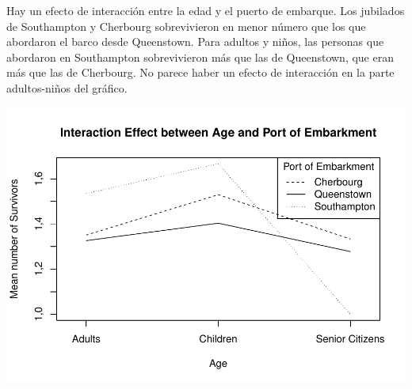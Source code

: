\documentclass[]{article}
\newenvironment{Shaded}{\begin{snugshade}}{\end{snugshade}}
\newcommand{\KeywordTok}[1]{\textcolor[rgb]{0.13,0.29,0.53}{\textbf{#1}}}
\newcommand{\DataTypeTok}[1]{\textcolor[rgb]{0.13,0.29,0.53}{#1}}
\newcommand{\DecValTok}[1]{\textcolor[rgb]{0.00,0.00,0.81}{#1}}
\newcommand{\StringTok}[1]{\textcolor[rgb]{0.31,0.60,0.02}{#1}}
\newcommand{\OtherTok}[1]{\textcolor[rgb]{0.56,0.35,0.01}{#1}}
\newcommand{\OperatorTok}[1]{\textcolor[rgb]{0.81,0.36,0.00}{\textbf{#1}}}
\newcommand{\NormalTok}[1]{#1}
\begin{document}
Hay un efecto de interacción entre la edad y el puerto de embarque. Los
jubilados de Southampton y Cherbourg sobrevivieron en menor número que
los que abordaron el barco desde Queenstown. Para adultos y niños, las
personas que abordaron en Southampton sobrevivieron más que las de
Queenstown, que eran más que las de Cherbourg. No parece haber un efecto
de interacción en la parte adultos-niños del gráfico.

\begin{Shaded}
\end{Shaded}

\includegraphics{titanicDataClean_files/figure-latex/unnamed-chunk-22-1.pdf}
\end{document}
